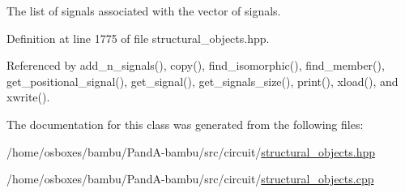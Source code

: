 The list of signals associated with the vector of signals. 



Definition at line 1775 of file structural\+\_\+objects.\+hpp.



Referenced by add\+\_\+n\+\_\+signals(), copy(), find\+\_\+isomorphic(), find\+\_\+member(), get\+\_\+positional\+\_\+signal(), get\+\_\+signal(), get\+\_\+signals\+\_\+size(), print(), xload(), and xwrite().



The documentation for this class was generated from the following files\+:\begin{DoxyCompactItemize}
\item 
/home/osboxes/bambu/\+Pand\+A-\/bambu/src/circuit/\hyperlink{structural__objects_8hpp}{structural\+\_\+objects.\+hpp}\item 
/home/osboxes/bambu/\+Pand\+A-\/bambu/src/circuit/\hyperlink{structural__objects_8cpp}{structural\+\_\+objects.\+cpp}\end{DoxyCompactItemize}
